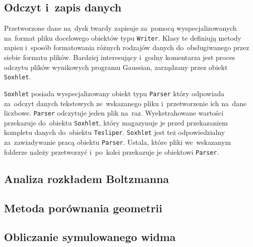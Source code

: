 \subsection{Odczyt i~zapis danych}\label{implementation:parsing}
Przetworzone dane na~dysk twardy \tesliper{} zapisuje za~pomocą wyspecjalizowanych na~format
  pliku docelowego obiektów typu \texttt{Writer}.
Klasy te definiują metody zapisu i~sposób formatowania różnych rodzajów danych do~obsługiwanego
  przez siebie formatu plików.
Bardziej interesujący i~godny komentarza jest proces odczytu plików wynikowych programu Gaussian,
  zarządzany przez obiekt \texttt{Soxhlet}.

\texttt{Soxhlet} posiada wyspecjalizowany obiekt typu \texttt{Parser}
  który odpowiada za~odczyt danych tekstowych ze~wskazanego pliku i~przetworzenie ich
  na~dane liczbowe.
\texttt{Parser} odczytuje jeden plik na~raz.
Wyekstrahowane wartości przekazuje do~obiektu \texttt{Soxhlet}, który magazynuje je przed
  przekazaniem kompletu danych do~obiektu \texttt{Tesliper}.
\texttt{Soxhlet} jest też odpowiedzialny za~zawiadywanie pracą obiektu \texttt{Parser}.
Ustala, które pliki we~wskazanym folderze należy przetworzyć i~po~kolei przekazuje je
  obiektowi \texttt{Parser}.


\subsection{Analiza rozkładem Boltzmanna}\label{implementation:boltzmann}
\subsection{Metoda porównania geometrii}\label{implementation:rmsd}
\subsection{Obliczanie symulowanego widma}\label{implementation:spectra}
